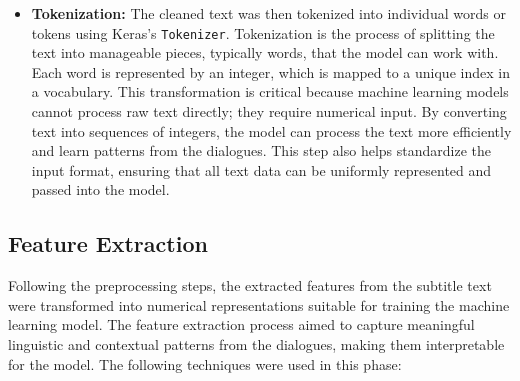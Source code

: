 \documentclass[conference]{IEEEtran}
\begin{document}
\begin{itemize}
    \item \textbf{Tokenization:} The cleaned text was then tokenized into individual words or tokens using Keras's \texttt{Tokenizer}. Tokenization is the process of splitting the text into manageable pieces, typically words, that the model can work with. Each word is represented by an integer, which is mapped to a unique index in a vocabulary. This transformation is critical because machine learning models cannot process raw text directly; they require numerical input. By converting text into sequences of integers, the model can process the text more efficiently and learn patterns from the dialogues. This step also helps standardize the input format, ensuring that all text data can be uniformly represented and passed into the model.
\end{itemize}


\subsection{Feature Extraction}
Following the preprocessing steps, the extracted features from the subtitle text were transformed into numerical representations suitable for training the machine learning model. The feature extraction process aimed to capture meaningful linguistic and contextual patterns from the dialogues, making them interpretable for the model. The following techniques were used in this phase:
\end{document}
